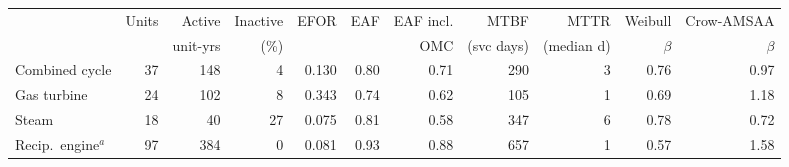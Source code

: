 \setlength{\tabcolsep}{2.5pt}
\begin{tabular}{lrrrrrrrrrr}
\toprule
 & Units & Active & Inactive & EFOR & EAF & EAF incl. & MTBF & MTTR & Weibull & Crow-AMSAA \\
 & & unit-yrs & (\%) & & & OMC & (svc days) & (median d) & $\beta$ & $\beta$ \\
\midrule
Combined cycle & 37 & 148 & 4 & 0.130 & 0.80 & 0.71 & 290 & 3 & 0.76 & 0.97 \\
Gas turbine & 24 & 102 & 8 & 0.343 & 0.74 & 0.62 & 105 & 1 & 0.69 & 1.18 \\
Steam & 18 & 40 & 27 & 0.075 & 0.81 & 0.58 & 347 & 6 & 0.78 & 0.72 \\
Recip.\ engine$^a$ & 97 & 384 & 0 & 0.081 & 0.93 & 0.88 & 657 & 1 & 0.57 & 1.58 \\
\bottomrule
\end{tabular}


